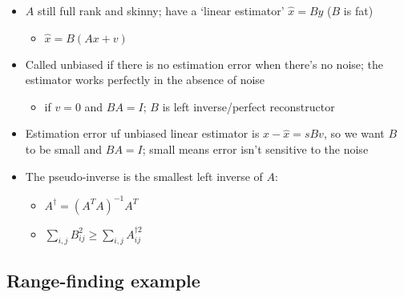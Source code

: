 \documentclass[10pt,letterpaper]{article}
\begin{document}
\begin{itemize}
\item $A$ still full rank and skinny; have a `linear estimator' $\hat x= By$ ($B$ is fat)

\begin{itemize}
\item $\hat x = B(Ax+v)$
\end{itemize}

\item Called unbiased if there is no estimation error when there's no noise; the estimator works perfectly in the absence of noise

\begin{itemize}
\item if $v=0$ and $BA=I$; $B$ is left inverse/perfect reconstructor
\end{itemize}

\item Estimation error uf unbiased linear estimator is $x- \hat x= sBv$, so we want $B$ to be small and $BA=I$; small means error isn't sensitive to the noise
\item The pseudo-inverse is the smallest left inverse of $A$:

\begin{itemize}
\item $A ^{\dagger} = (A ^{T} A) ^{-1} A ^{T}$
\item $\displaystyle \sum _{i,j} B ^{2} _{ij} \ge \sum _{i,j} A _{ij} ^{\dagger 2}$
\end{itemize}

\end{itemize}
\subsection{Range-finding example}
\label{sec-4_9}
\end{document}
